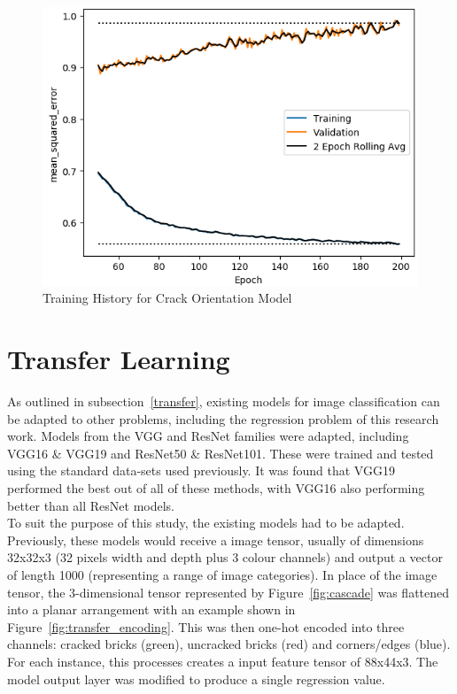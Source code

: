 \begin{figure}[!ht]
	\centering
	\includegraphics[scale=0.7]{Figures/train_history_ori.png}
	\caption{Training History for Crack Orientation Model }
	\label{fig:history_ori}
\end{figure}

\section{Transfer Learning}


As outlined in subsection~\ref{transfer}, existing models for image classification can be adapted to other problems, including the regression problem of this research work. Models from the VGG and ResNet families were adapted, including VGG16 \& VGG19 and ResNet50 \& ResNet101. These were trained and tested using the standard data-sets used previously. It was found that VGG19 performed the best out of all of these methods, with VGG16 also performing better than all ResNet models.
\\

\noindent
To suit the purpose of this study, the existing models had to be adapted. Previously, these models would receive a image tensor, usually of dimensions 32x32x3 (32 pixels width and depth plus 3 colour channels) and output a vector of length 1000 (representing a range of image categories). In place of the image tensor, the 3-dimensional tensor represented by Figure~\ref{fig:cascade} was flattened into a planar arrangement with an example shown in Figure~\ref{fig:transfer_encoding}. This was then one-hot encoded into three channels: cracked bricks (green), uncracked bricks (red) and corners/edges (blue). For each instance, this processes creates a input feature tensor of 88x44x3. The model output layer was modified to produce a single regression value.  
\\

